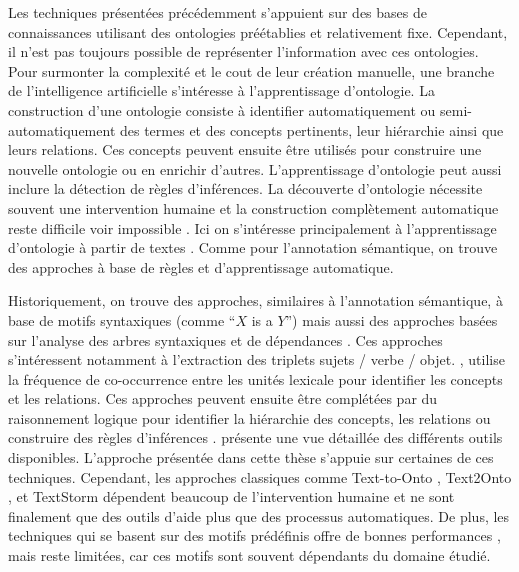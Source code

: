 Les techniques présentées précédemment s'appuient sur des bases de connaissances utilisant des ontologies préétablies et relativement fixe.
Cependant, il n'est pas toujours possible de représenter l'information avec ces ontologies.
Pour surmonter la complexité et le cout de leur création manuelle, une branche de l'intelligence artificielle s'intéresse à l'apprentissage d'ontologie.
La construction d'une ontologie consiste à identifier automatiquement ou semi-automatiquement des termes et des concepts pertinents, leur hiérarchie ainsi que leurs relations.
Ces concepts peuvent ensuite être utilisés pour construire une nouvelle ontologie ou en enrichir d'autres.
L'apprentissage d'ontologie peut aussi inclure la détection de règles d'inférences.
La découverte d'ontologie nécessite souvent une intervention humaine \cite{navarro-almanzaAutomatedOntologyExtraction2020} et la construction complètement automatique reste difficile voir impossible \cite{hazmanSurveyOntologyLearning2011,wongOntologyLearningText2012,browarnikOntologyLearningText2015}.
Ici on s'intéresse principalement à l'apprentissage d'ontologie à partir de textes \cite{konysKnowledgeRepositoryOntology2019,watrobskiOntologyLearningMethods2020,al-aswadiAutomaticOntologyConstruction2020}.
Comme pour l'annotation sémantique, on trouve des approches à base de règles et d'apprentissage automatique.

Historiquement, on trouve des approches, similaires à l'annotation sémantique, à base de motifs syntaxiques (comme \enquote{$X$ is a $Y$}) \cite{morinAutomaticAcquisitionSemantic1999} mais aussi des approches basées sur l'analyse des arbres syntaxiques et de dépendances \cite{gamalloMappingSyntacticDependencies2002,nivreIncrementalityDeterministicDependency2004}.
Ces approches s'intéressent notamment à l'extraction des triplets sujets / verbe / objet.
\cite{budanitskyLexicalSemanticRelatedness1999}, utilise la fréquence de co-occurrence entre les unités lexicale pour identifier les concepts et les relations.
Ces approches peuvent ensuite être complétées par du raisonnement logique pour identifier la hiérarchie des concepts, les relations ou construire des règles d'inférences \cite{zelleLearningSemanticGrammars1993}.
\cite{al-aswadiAutomaticOntologyConstruction2020} présente une vue détaillée des différents outils disponibles.
L'approche présentée dans cette thèse s'appuie sur certaines de ces techniques.
Cependant, les approches classiques comme {Text-to-Onto} \cite{maedcheTexttoontoOntologyExtraction2001}, {Text2Onto} \cite{cimianoText2Onto2005}, et {TextStorm} \cite{alvesAutomaticReadingLearning2002} dépendent beaucoup de l'intervention humaine et ne sont finalement que des outils d'aide plus que des processus automatiques.
De plus, les techniques qui se basent sur des motifs prédéfinis offre de bonnes performances \cite{savaryRelationExtractionClinical2022}, mais reste limitées, car ces motifs sont souvent dépendants du domaine étudié.

